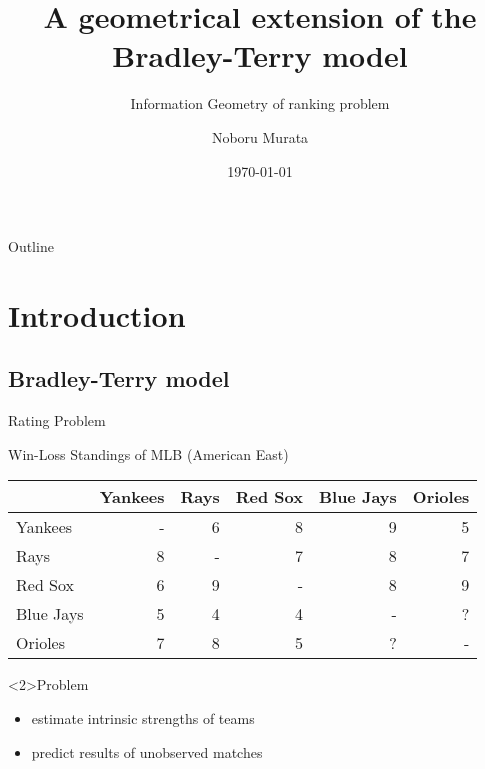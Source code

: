 \documentclass[fleqn,aspectratio=1610]{beamer}
\author{Noboru Murata}
\date{\today}
\title{A geometrical extension of the Bradley-Terry model}
\subtitle{Information Geometry of ranking problem}
\institute{\url{https://noboru-murata.github.io/}}
\begin{document}
\maketitle
\begin{frame}{Outline}
\tableofcontents
\end{frame}


\section{Introduction}
\label{sec:orgd364013}
\subsection{Bradley-Terry model}
\label{sec:orgd37efe4}
\begin{frame}[label={sec:orgd9b90f4}]{Rating Problem}
\begin{exampleblock}{Win-Loss Standings of MLB (American East)}\label{sec:org160a4a1}
\begin{center}
\begin{tabular}{l|rrrrr}
\hline
 & Yankees & Rays & Red Sox & Blue Jays & Orioles\\[0pt]
\hline
Yankees & - & 6 & 8 & 9 & 5\\[0pt]
Rays & 8 & - & 7 & 8 & 7\\[0pt]
Red Sox & 6 & 9 & - & 8 & 9\\[0pt]
Blue Jays & 5 & 4 & 4 & - & \alert{?}\\[0pt]
Orioles & 7 & 8 & 5 & \alert{?} & -\\[0pt]
\hline
\end{tabular}
\end{center}
\end{exampleblock}
\begin{alertblock}<2>{Problem}
\begin{itemize}
\item estimate intrinsic strengths of teams
\item predict results of unobserved matches
\end{itemize}
\end{alertblock}
\end{frame}
\end{document}
